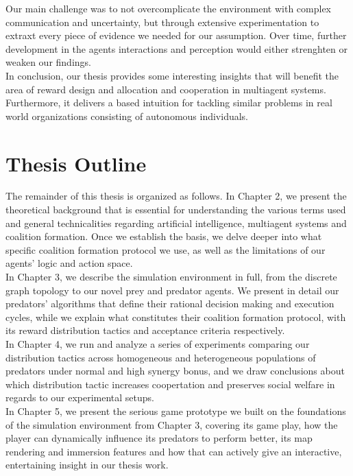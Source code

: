 \documentclass[12pt,a4paper]{report}
\begin{document}
	Our main challenge was to not overcomplicate the environment with complex communication and uncertainty, but through extensive experimentation to extraxt every piece of evidence we needed for our assumption. Over time, further development in the agents interactions and perception would either strenghten or weaken our findings. \\

	In conclusion, our thesis provides some interesting insights that will benefit the area of reward design and allocation and cooperation in multiagent systems. Furthermore, it delivers a based intuition for tackling similar problems in real world organizations consisting of autonomous individuals. \\
	
	\section{Thesis Outline}
	
	The remainder of this thesis is organized as follows. In Chapter 2, we present the theoretical background that is essential for understanding the various terms used and general technicalities regarding artificial intelligence, multiagent systems and coalition formation. Once we establish the basis, we delve deeper into what specific coalition formation protocol we use, as well as the limitations of our agents' logic and action space. \\
 	
    In Chapter 3, we describe the simulation environment in full, from the discrete graph topology to our novel prey and predator agents. We present in detail our predators' algorithms that define their rational decision making and execution cycles, while we explain what constitutes their coalition formation protocol, with its reward distribution tactics and acceptance criteria respectively. \\
	
	In Chapter 4, we run and analyze a series of experiments comparing our distribution tactics across homogeneous and heterogeneous populations of predators under normal and high synergy bonus, and we draw conclusions about which distribution tactic increases coopertation and preserves social welfare in regards to our experimental setups. \\
	
	In Chapter 5, we present the serious game prototype we built on the foundations of the simulation environment from Chapter 3, covering its game play, how the player can dynamically influence its predators to perform better, its map rendering and immersion features and how that can actively give an interactive, entertaining insight in our thesis work. \\
	
\end{document}
